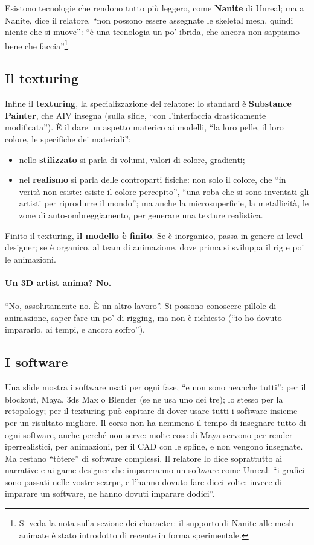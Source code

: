 Esistono tecnologie che rendono tutto più leggero, come \textbf{Nanite} di
Unreal; ma a Nanite, dice il relatore, ``non possono essere assegnate le
skeletal mesh, quindi niente che si muove'': ``è una tecnologia un po' ibrida,
che ancora non sappiamo bene che faccia''\footnote{Si veda la nota sulla
sezione dei character: il supporto di Nanite alle mesh animate è stato
introdotto di recente in forma sperimentale.}.

\subsection{Il texturing}

Infine il \textbf{texturing}, la specializzazione del relatore: lo standard è
\textbf{Substance Painter}, che AIV insegna (sulla slide, ``con l'interfaccia
drasticamente modificata''). È il dare un aspetto materico ai modelli, ``la
loro pelle, il loro colore, le specifiche dei materiali'':
\begin{itemize}
  \item nello \textbf{stilizzato} si parla di volumi, valori di colore,
        gradienti;
  \item nel \textbf{realismo} si parla delle controparti fisiche: non solo il
        colore, che ``in verità non esiste: esiste il colore percepito'', ``una
        roba che si sono inventati gli artisti per riprodurre il mondo''; ma
        anche la microsuperficie, la metallicità, le zone di
        auto-ombreggiamento, per generare una texture realistica.
\end{itemize}
Finito il texturing, \textbf{il modello è finito}. Se è inorganico, passa in
genere ai level designer; se è organico, al team di animazione, dove prima si
sviluppa il rig e poi le animazioni.

\paragraph{Un 3D artist anima? No.} ``No, assolutamente no. È un altro lavoro''.
Si possono conoscere pillole di animazione, saper fare un po' di rigging, ma
non è richiesto (``io ho dovuto impararlo, ai tempi, e ancora soffro'').

\subsection{I software}

Una slide mostra i software usati per ogni fase, ``e non sono neanche tutti'':
per il blockout, Maya, 3ds Max o Blender (se ne usa uno dei tre); lo stesso per
la retopology; per il texturing può capitare di dover usare tutti i software
insieme per un risultato migliore. Il corso non ha nemmeno il tempo di insegnare
tutto di ogni software, anche perché non serve: molte cose di Maya servono per
render iperrealistici, per animazioni, per il CAD con le spline, e non vengono
insegnate. Ma restano ``tòtere'' di software complessi. Il relatore lo dice
soprattutto ai narrative e ai game designer che impareranno un software come
Unreal: ``i grafici sono passati nelle vostre scarpe, e l'hanno dovuto fare
dieci volte: invece di imparare un software, ne hanno dovuti imparare
dodici''.

